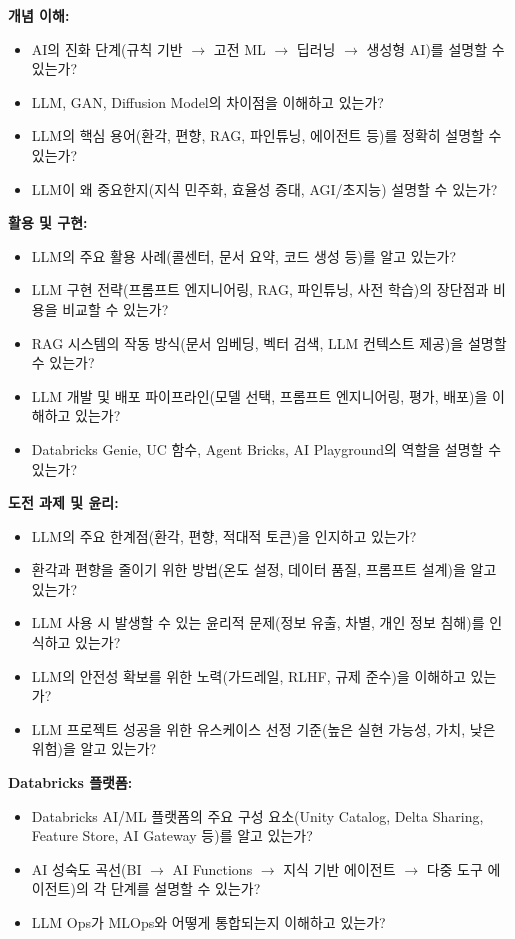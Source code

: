\documentclass[11pt,a4paper]{article}
\theoremstyle{definition}
\begin{document}
\begin{tcolorbox}[mybox={LLM 학습 및 프로젝트 점검표}]
    \textbf{개념 이해:}
    \begin{itemize}
        \item AI의 진화 단계(규칙 기반 $\rightarrow$ 고전 ML $\rightarrow$ 딥러닝 $\rightarrow$ 생성형 AI)를 설명할 수 있는가?
        \item LLM, GAN, Diffusion Model의 차이점을 이해하고 있는가?
        \item LLM의 핵심 용어(환각, 편향, RAG, 파인튜닝, 에이전트 등)를 정확히 설명할 수 있는가?
        \item LLM이 왜 중요한지(지식 민주화, 효율성 증대, AGI/초지능) 설명할 수 있는가?
    \end{itemize}

    \textbf{활용 및 구현:}
    \begin{itemize}
        \item LLM의 주요 활용 사례(콜센터, 문서 요약, 코드 생성 등)를 알고 있는가?
        \item LLM 구현 전략(프롬프트 엔지니어링, RAG, 파인튜닝, 사전 학습)의 장단점과 비용을 비교할 수 있는가?
        \item RAG 시스템의 작동 방식(문서 임베딩, 벡터 검색, LLM 컨텍스트 제공)을 설명할 수 있는가?
        \item LLM 개발 및 배포 파이프라인(모델 선택, 프롬프트 엔지니어링, 평가, 배포)을 이해하고 있는가?
        \item Databricks Genie, UC 함수, Agent Bricks, AI Playground의 역할을 설명할 수 있는가?
    \end{itemize}

    \textbf{도전 과제 및 윤리:}
    \begin{itemize}
        \item LLM의 주요 한계점(환각, 편향, 적대적 토큰)을 인지하고 있는가?
        \item 환각과 편향을 줄이기 위한 방법(온도 설정, 데이터 품질, 프롬프트 설계)을 알고 있는가?
        \item LLM 사용 시 발생할 수 있는 윤리적 문제(정보 유출, 차별, 개인 정보 침해)를 인식하고 있는가?
        \item LLM의 안전성 확보를 위한 노력(가드레일, RLHF, 규제 준수)을 이해하고 있는가?
        \item LLM 프로젝트 성공을 위한 유스케이스 선정 기준(높은 실현 가능성, 가치, 낮은 위험)을 알고 있는가?
    \end{itemize}

    \textbf{Databricks 플랫폼:}
    \begin{itemize}
        \item Databricks AI/ML 플랫폼의 주요 구성 요소(Unity Catalog, Delta Sharing, Feature Store, AI Gateway 등)를 알고 있는가?
        \item AI 성숙도 곡선(BI $\rightarrow$ AI Functions $\rightarrow$ 지식 기반 에이전트 $\rightarrow$ 다중 도구 에이전트)의 각 단계를 설명할 수 있는가?
        \item LLM Ops가 MLOps와 어떻게 통합되는지 이해하고 있는가?
    \end{itemize}
\end{tcolorbox}
\end{document}
